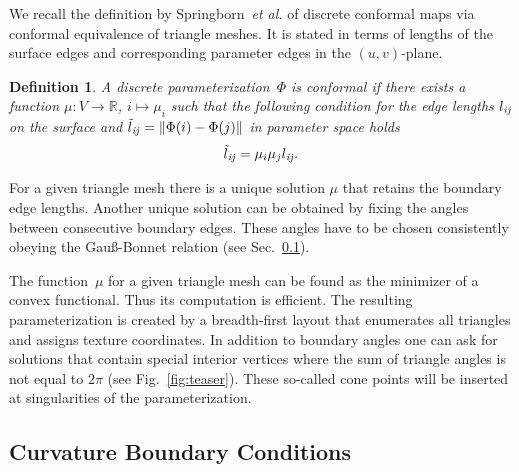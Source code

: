 \documentclass[twoside]{article}
\newtheorem{definition}{Definition}[section]
\begin{document}
We recall the definition by Springborn~\emph{et al.} of discrete conformal 
maps via conformal equivalence of triangle meshes. It is stated in terms of
lengths of the surface edges and corresponding parameter edges in the 
$(u,v)$-plane.
\begin{definition} 
  A discrete parameterization~$\Phi$ is \emph{conformal} if there exists a
function $\mu:V \to \mathbb{R}$, $i \mapsto \mu_i$ such that the following
condition for the edge lengths $l_{\mathrm{\it{ij}}}$ on the surface and
$\tilde{l}_{\mathrm{\it{ij}}}=\Vert\Phi(i)-\Phi(j)\Vert$ in parameter space holds
\begin{eqnarray}
  \label{eq:discrete_conformal} 
  \tilde{l}_{\mathrm{\it{ij}}}=\mu_i\mu_j l_{\mathrm{\it{ij}}}.
\end{eqnarray}
\end{definition}
For a given triangle mesh there is a unique solution $\mu$ that retains the 
boundary edge lengths. Another unique solution can be obtained by fixing 
the angles between consecutive boundary edges. These angles have to be 
chosen consistently obeying the Gau\ss-Bonnet relation 
(see Sec.~\ref{sub:boundary}).

The function~$\mu$ for a given triangle mesh can be found as the minimizer 
of a convex functional. Thus its computation is efficient. The resulting 
parameterization is created by a breadth-first layout that enumerates 
all triangles and assigns texture coordinates. In addition to boundary angles 
one can ask for solutions that contain special interior vertices where the
 sum of triangle angles is not equal to $2\pi$ (see Fig.~\ref{fig:teaser}). 
These so-called cone points will be inserted at singularities of the 
parameterization.

%

\subsection{Curvature Boundary Conditions}
\label{sub:boundary}
\end{document}
